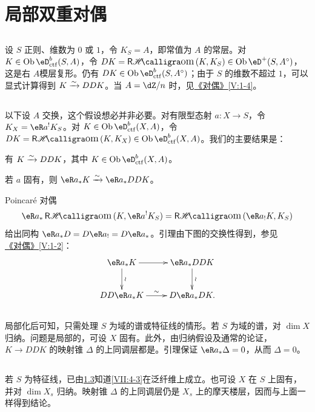 \section{局部双重对偶}\label{VII:4}
\subsection{}\label{VII:4-1}
设 $S$ 正则、维数为 $0$ 或 $1$，令 $K_S=A$，即常值为 $A$ 的常层。对 $K\in\ob\eD_{\mathrm{ctf}}^b(S,A)$，令
$DK=\rHom(K,K_S)\in\ob\eD^+(S,A^\circ)$，这是右 $A$模层复形。仍有 $DK\in\ob\eD_{\mathrm{ctf}}^b(S,A^\circ)$；由于 $S$ 的维数不超过 $1$，可以显式计算得到 $K\xrightarrow\sim DDK$。当 $A=\dZ/n$ 时，见\hyperref[V]{《对偶》}\ref{V:1-4}。
\subsection{}\label{VII:4-2}
以下设 $A$ 交换，这个假设想必并非必要。对有限型态射 $a:X\to S$，令 $K_X=\eR a^!K_S$。对 $K\in\ob\eD_{\mathrm{ctf}}^b(X,A)$，令
$DK=\rHom(K,K_X)\in\ob\eD_{\mathrm{ctf}}^b(X,A)$。我们的主要结果是：
\begin{theorem_}\label{VII:4-3}
有 $K\xrightarrow\sim DDK$，其中 $K\in\ob\eD_{\mathrm{ctf}}^b(X,A)$。
\end{theorem_}
\begin{lemma_}\label{VII:4-4}
若 $a$ 固有，则 $\eR a_\ast K\iso\eR a_\ast DDK$。
\end{lemma_}
Poincaré 对偶
\[
 \eR a_\ast\rHom(K,\eR a^!K_S)=\rHom(\eR a_!K,K_S)
\]
给出同构 $\eR a_\ast D=D\eR a_!=D\eR a_\ast$。引理由下图的交换性得到，参见\hyperref[V]{《对偶》}\ref{V:1-2}：
\[\xymatrix{
 \eR a_\ast K\ar[r]\ar[d]^-\wr&\eR a_\ast DDK\ar[d]^-\wr\\
 DD\eR a_\ast K\ar[r]^-\sim&D\eR a_\ast DK.
}\]
\subsection{}\label{VII:4-5}
局部化后可知，只需处理 $S$ 为域的谱或特征线的情形。若 $S$ 为域的谱，对 $\dim X$ 归纳。问题是局部的，可设 $X$ 固有。此外，由归纳假设及通常的论证，$K\to DDK$ 的映射锥 $\Delta$ 的上同调层都是。引理保证 $\eR a_\ast\Delta=0$，从而 $\Delta=0$。
\subsection{}\label{VII:4-6}
若 $S$ 为特征线，已由\ref{VII:4-5}知道\ref{VII:4-3}在泛纤维上成立。也可设 $X$ 在 $S$ 上固有，并对 $\dim X_s$ 归纳。映射锥 $\Delta$ 的上同调层仍是 $X_s$ 上的摩天楼层，因而与上面一样得到结论。

